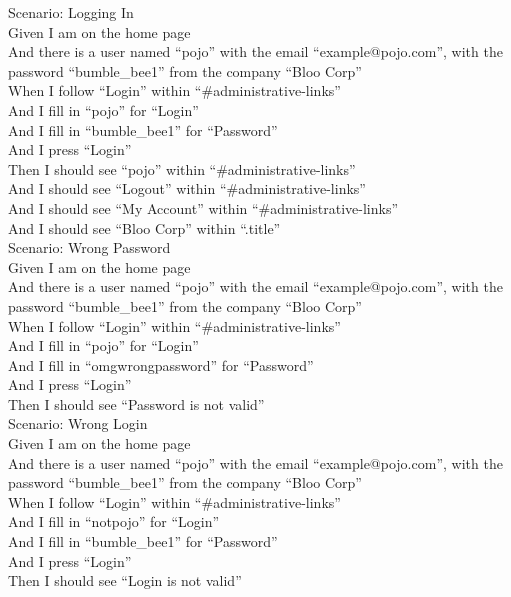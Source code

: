 \documentclass[12pt]{article}
\begin{document}
Scenario: Logging In \\
  Given I am on the home page \\
  And there is a user named ``pojo'' with the email ``example@pojo.com'', with the password ``bumble\_bee1'' from the company ``Bloo Corp'' \\
  When I follow ``Login'' within ``\#administrative-links'' \\
  And I fill in ``pojo'' for ``Login'' \\
  And I fill in ``bumble\_bee1'' for ``Password'' \\
  And I press ``Login'' \\
  Then I should see ``pojo'' within ``\#administrative-links'' \\
  And I should see ``Logout'' within ``\#administrative-links'' \\
  And I should see ``My Account'' within ``\#administrative-links'' \\
  And I should see ``Bloo Corp'' within ``.title'' \\

Scenario: Wrong Password \\
  Given I am on the home page \\
  And there is a user named ``pojo'' with the email ``example@pojo.com'', with the password ``bumble\_bee1'' from the company ``Bloo Corp'' \\
  When I follow ``Login'' within ``\#administrative-links'' \\
  And I fill in ``pojo'' for ``Login'' \\
  And I fill in ``omgwrongpassword'' for ``Password'' \\
  And I press ``Login'' \\
  Then I should see ``Password is not valid'' \\

Scenario: Wrong Login \\
  Given I am on the home page \\
  And there is a user named ``pojo'' with the email ``example@pojo.com'', with the password ``bumble\_bee1'' from the company ``Bloo Corp'' \\
  When I follow ``Login'' within ``\#administrative-links'' \\
  And I fill in ``notpojo'' for ``Login'' \\
  And I fill in ``bumble\_bee1'' for ``Password'' \\
  And I press ``Login'' \\
  Then I should see ``Login is not valid'' \\
\end{document}
